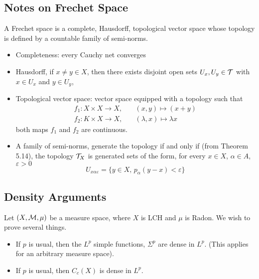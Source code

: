 \documentclass[../../main.tex]{subfiles}
\begin{document}
\subsection{Notes on Frechet Space}
A Frechet space is a complete, Hausdorff, topological vector space whose topology is defined by a countable family of semi-norms.
\begin{itemize}
    \item Completeness: every Cauchy net converges
    \item Hausdorff, if $x\neq y\in X$, then there exists disjoint open sets $U_x, U_y\in\mathcal{T}$ with $x\in U_x$ and $y\in U_y$,
    \item Topological vector space: vector space equipped with a topology such that
    \begin{align*}
        f_1:X\times X\to X,&\quad (x,y)\mapsto (x+y)\\
        f_2:K\times X\to X,&\quad (\lambda, x)\mapsto \lambda x
    \end{align*}
    both maps $f_1$ and $f_2$ are continuous.
    \item A family of semi-norms, generate the topology if and only if (from Theorem 5.14), the topology $\mathcal{T}_X$ is generated sets of the form, for every $x\in X$, $\alpha\in A$, $\varepsilon>0$
    \[
    U_{x\alpha\varepsilon}=\biggl\{y\in X,\,p_\alpha(y-x)<\varepsilon\biggr\}
    \]
\end{itemize}
\newpage

\subsection{Density Arguments}
Let $(X,\mathcal{M},\mu)$ be a measure space, where $X$ is LCH and $\mu$ is Radon. We wish to prove several things.
\begin{itemize}
    \item If $p$ is usual, then the $L^p$ simple functions, $\Sigma^p$ are dense in $L^p$. (This applies for an arbitrary measure space). 
    \item If $p$ is usual, then $C_c(X)$ is dense in $L^p$.
\end{itemize}
\end{document}
